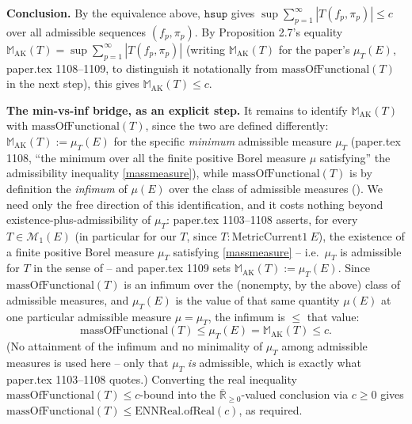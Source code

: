 \begin{definition}
  \textbf{Conclusion.} By the equivalence above, $\mathtt{hsup}$ gives
  $\sup \sum_{p=1}^\infty |T(f_p,\pi_p)| \le c$ over all admissible sequences $(f_p,\pi_p)$. By
  Proposition 2.7's equality $\mathbb{M}_{\mathrm{AK}}(T) = \sup \sum_{p=1}^\infty
  |T(f_p,\pi_p)|$ (writing $\mathbb{M}_{\mathrm{AK}}(T)$ for the paper's $\mu_T(E)$, paper.tex
  1108--1109, to distinguish it notationally from $\mathrm{massOfFunctional}(T)$ in the next step),
  this gives $\mathbb{M}_{\mathrm{AK}}(T) \le c$.

  \textbf{The min-vs-inf bridge, as an explicit step.} It remains to identify
  $\mathbb{M}_{\mathrm{AK}}(T)$ with $\mathrm{massOfFunctional}(T)$, since the two are defined
  differently: $\mathbb{M}_{\mathrm{AK}}(T) := \mu_T(E)$ for the specific \emph{minimum} admissible
  measure $\mu_T$ (paper.tex 1108, ``the minimum over all the finite positive Borel measure $\mu$
  satisfying'' the admissibility inequality \eqref{massmeasure}), while
  $\mathrm{massOfFunctional}(T)$ is by definition the \emph{infimum} of $\mu(E)$ over the class of
  admissible measures (). We need only the free direction of this
  identification, and it costs nothing beyond existence-plus-admissibility of $\mu_T$: paper.tex
  1103--1108 asserts, for every $T \in \mathcal{M}_1(E)$ (in particular for our $T$, since $T :
  \mathrm{MetricCurrent1}\ E$), the existence of a finite positive Borel measure $\mu_T$ satisfying
  \eqref{massmeasure} -- i.e.\ $\mu_T$ is admissible for $T$ in the sense of
   -- and paper.tex 1109 sets $\mathbb{M}_{\mathrm{AK}}(T) := \mu_T(E)$. Since
  $\mathrm{massOfFunctional}(T)$ is an infimum over the (nonempty, by the above) class of
  admissible measures, and $\mu_T(E)$ is the value of that same quantity $\mu(E)$ at one particular
  admissible measure $\mu = \mu_T$, the infimum is $\le$ that value:
  \[
    \mathrm{massOfFunctional}(T) \le \mu_T(E) = \mathbb{M}_{\mathrm{AK}}(T) \le c
    .
  \]
  (No attainment of the infimum and no minimality of $\mu_T$ among admissible measures is used
  here -- only that $\mu_T$ \emph{is} admissible, which is exactly what paper.tex 1103--1108
  quotes.) Converting the real inequality $\mathrm{massOfFunctional}(T) \le c$-bound into the
  $\overline{\mathbb{R}}_{\ge 0}$-valued conclusion via $c \ge 0$ gives $\mathrm{massOfFunctional}(T)
  \le \mathrm{ENNReal.ofReal}(c)$, as required.
\end{definition}
